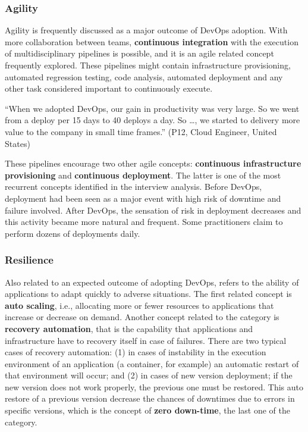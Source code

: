 \subsubsection{Agility}

Agility is frequently discussed as a major outcome of DevOps adoption. With more
collaboration between teams, \textbf{continuous integration} with the execution of
multidisciplinary pipelines is possible, and it is an agile related concept
frequently explored. These pipelines might contain
infrastructure provisioning, automated regression testing, code analysis,
automated deployment and any other task considered important
to continuously execute.

\begin{mq}
``When we adopted DevOps, our gain in productivity was very large. So
  we went from a deploy per 15 days to 40 deploys a day. So \ldots,
  we started to delivery more value to the company in small time
  frames.'' (P12, Cloud Engineer, United States)
\end{mq}

These pipelines encourage two other agile concepts: \textbf{continuous
infrastructure provisioning} and \textbf{continuous deployment}. The latter is
one of the most recurrent concepts identified in the interview analysis. Before
DevOps, deployment had been seen as a major event with high risk of downtime and
failure involved. After DevOps, the sensation of risk in deployment decreases
and this activity became more natural and frequent. Some practitioners claim
to perform dozens of deployments daily.

\subsubsection{Resilience}

Also related to an expected outcome of adopting DevOps,  refers
to the ability of applications to adapt quickly to adverse situations.
The first related concept is \textbf{auto scaling}, i.e.,
allocating more or fewer resources to applications that increase or
decrease on demand. Another concept related to
the  category is \textbf{recovery automation}, that is
the capability that applications and infrastructure have to recovery itself in case of
failures. There are two typical cases of recovery automation: (1) in cases
of instability in the execution environment of an application (a
container, for example) an automatic restart of that environment will occur; and (2) in
cases of new version deployment; if the new version does not work properly, the
previous one must be restored. This auto restore of a previous version
decrease the chances of downtimes due to errors in specific versions, which
is the concept of \textbf{zero down-time}, the last one of the  category.

